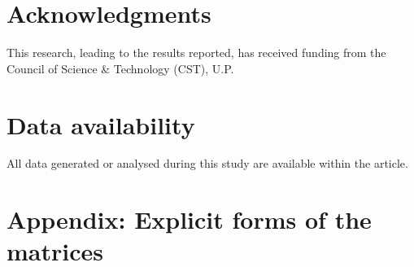 \documentclass[aps,prb,onecolumn,nofootinbib,citeautoscript,10pt, showkeys]{revtex4-2}
\begin{document}
\section*{Acknowledgments}

This research, leading to the results reported, has received funding from the Council of Science \& Technology (CST), U.P.

\section*{Data availability}

All data generated or analysed during this study are available within the article.



\appendix

\section*{Appendix: Explicit forms of the matrices}
\label{appmat}
\end{document}
